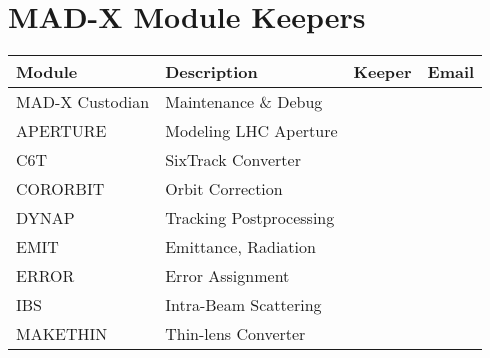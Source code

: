 \documentclass{JAC2003}
\begin{document}
 
 
\section{MAD-X Module Keepers} 

%
\begin{table}[H]\vspace*{-6mm}\footnotesize
\begin{center}
\begin{tabular}{l|l|l|l}
\hline
\textbf{Module}    &\textbf{Description}        &\textbf{Keeper}                     &\textbf{Email}            	 \\\hline
MAD-X Custodian    &Maintenance \& Debug        &{\color{green}{tba}}                            & {\color{red}{}}         \\\hline
APERTURE           &Modeling LHC Aperture       &{\color{green}{J.B.~Jeanneret}}                 & {\color{red}{Bernard.Jeanneret@cern.ch}}   \\ \hline                
C6T                &SixTrack Converter          &{\color{green}{F.~Schmidt}}                     & {\color{red}{Frank.Schmidt@cern.ch}}       \\\hline
CORORBIT           &Orbit Correction            &{\color{green}{W.~Herr}}                        & {\color{red}{Werner.Herr@cern.ch}}         \\\hline
DYNAP              &Tracking Postprocessing     &{\color{green}{F.~Zimmermann}}                  & {\color{red}{Frank.Zimmermann@cern.ch}}    \\\hline
EMIT               &Emittance, Radiation        &{\color{green}{R ~Tom\'as}}                     & {\color{red}{Rogelio.Tomas@cern.ch}}       \\\hline
ERROR              &Error Assignment            &{\color{green}{W.~Herr}}                        & {\color{red}{Werner.Herr@cern.ch}}         \\\hline
IBS                &Intra-Beam Scattering       &{\color{green}{F.~Zimmermann}}                  & {\color{red}{Frank.Zimmermann@cern.ch}}    \\\hline
MAKETHIN           &Thin-lens Converter         &{\color{green}{H.~Burkhardt}}                   & {\color{red}{Helmut.Burkhardt@cern.ch}}    \\\hline

\end{tabular}
\end{center}
\end{table}
\end{document}
